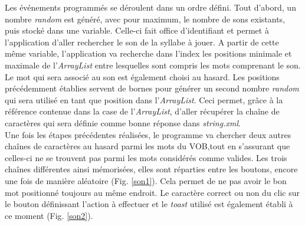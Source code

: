 Les événements programmés se déroulent dans un ordre défini. Tout d'abord, un nombre \textit{random} est généré, avec pour maximum, le nombre de sons existants, puis stocké dans une variable. Celle-ci fait office d'identifiant et permet à l'application d'aller rechercher le son de la syllabe à jouer. A partir de cette même variable, l'application va recherche dans l'index les positions minimale et maximale de l'\textit{ArrayList} entre lesquelles sont compris les mots comprenant le son. Le mot qui sera associé au son est également choisi au hasard. Les positions précédemment établies servent de bornes pour générer un second nombre \textit{random} qui sera utilisé en tant que position dans l'\textit{ArrayList}. Ceci permet, grâce à la référence contenue dans la case de l'\textit{ArrayList}, d'aller récupérer la chaîne de caractères qui sera définie comme bonne réponse dans \textit{string.xml}.\\

Une fois les étapes précédentes réalisées, le programme va chercher deux autres chaînes de caractères au hasard parmi les mots du VOB,tout en s'assurant que celles-ci ne se trouvent pas parmi les mots considérés comme valides. Les trois chaînes différentes ainsi mémorisées, elles sont réparties entre les boutons, encore une fois de manière aléatoire (Fig. \ref{son1}). Cela permet de ne pas avoir le bon mot positionné toujours au même endroit. Le caractère correct ou non du clic sur le bouton définissant l'action à effectuer et le \textit{toast} utilisé est également établi à ce moment (Fig. \ref{son2}).\\

